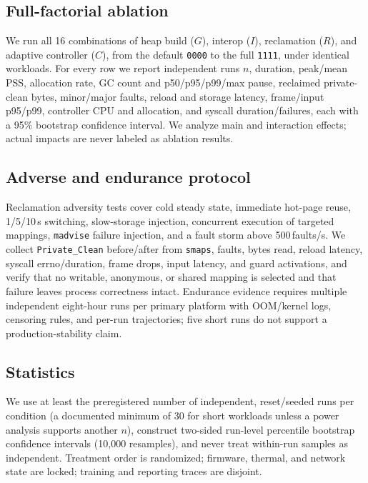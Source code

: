 \documentclass[acmsmall,screen]{acmart}
\begin{document}
\subsection{Full-factorial ablation}
\label{sec:method-factorial}
We run all 16 combinations of heap build ($G$), interop ($I$), reclamation
($R$), and adaptive controller ($C$), from the default \texttt{0000} to the
full \texttt{1111}, under identical workloads. For every row we report
independent runs $n$, duration, peak/mean PSS, allocation rate, GC count
and p50/p95/p99/max pause, reclaimed private-clean bytes, minor/major
faults, reload and storage latency, frame/input p95/p99, controller CPU and
allocation, and syscall duration/failures, each with a 95\% bootstrap
confidence interval. We analyze main and interaction effects; actual
impacts are never labeled as ablation results.

\subsection{Adverse and endurance protocol}
Reclamation adversity tests cover cold steady state, immediate hot-page
reuse, 1/5/10\,s switching, slow-storage injection, concurrent execution of
targeted mappings, \texttt{madvise} failure injection, and a fault storm
above 500\,faults/s. We collect \texttt{Private\_Clean} before/after from
\texttt{smaps}, faults, bytes read, reload latency, syscall errno/duration,
frame drops, input latency, and guard activations, and verify that no
writable, anonymous, or shared mapping is selected and that failure leaves
process correctness intact. Endurance evidence requires multiple
independent eight-hour runs per primary platform with OOM/kernel logs,
censoring rules, and per-run trajectories; five short runs do not support a
production-stability claim.

\subsection{Statistics}
We use at least the preregistered number of independent, reset/seeded runs
per condition (a documented minimum of 30 for short workloads unless a power
analysis supports another $n$), construct two-sided run-level percentile
bootstrap confidence intervals (10{,}000 resamples), and never treat
within-run samples as independent. Treatment order is randomized;
firmware, thermal, and network state are locked; training and reporting
traces are disjoint.

\end{document}

